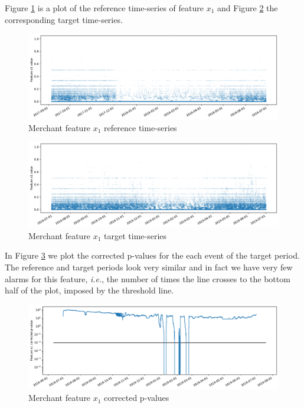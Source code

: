 Figure \ref{fig:merchant-x1-reference} is a plot of the reference time-series of feature $x_1$ and Figure \ref{fig:merchant-x1-target} the corresponding target time-series.
\begin{figure}[!htb]
    \begin{center}
      \includegraphics[scale=0.5]{figures/merchant-x1-reference.pdf}
      \caption{Merchant feature $x_1$ reference time-series}
      \label{fig:merchant-x1-reference}
    \end{center}
\end{figure}
\begin{figure}[!htb]
    \begin{center}
      \includegraphics[scale=0.5]{figures/merchant-x1-target.pdf}
      \caption{Merchant feature $x_1$ target time-series}
      \label{fig:merchant-x1-target}
    \end{center}
\end{figure}
In Figure \ref{fig:merchant-x1-correctedpvalues} we plot the corrected p-values for the each event of the target period. The reference and target periods look very similar and in fact we have very few alarms for this feature, \textit{i.e.}, the number of times the line crosses to the bottom half of the plot, imposed by the threshold line. 
\begin{figure}[!htb]
    \begin{center}
      \includegraphics[scale=0.5]{figures/merchant-x1-correctedpvalues.pdf}
      \caption{Merchant feature $x_1$ corrected p-values}
      \label{fig:merchant-x1-correctedpvalues}
    \end{center}
\end{figure}
